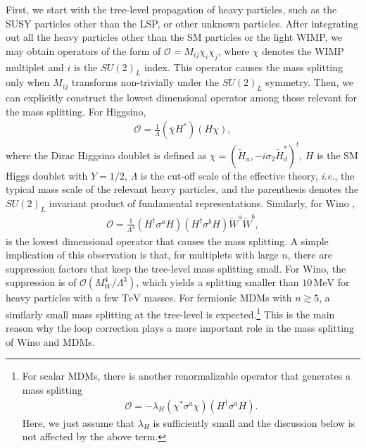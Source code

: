 \documentclass[12pt,twoside,book]{article}
\begin{document}
First, we start with the tree-level propagation of heavy particles, such as the SUSY particles other than the LSP, or other unknown particles.
After integrating out all the heavy particles other than the SM particles or the light WIMP, we may obtain operators of the form of $\mathcal{O} = M_{i j} \chi_i \chi_j$, where $\chi$ denotes the WIMP multiplet and $i$ is the $SU(2)_L$ index.
This operator causes the mass splitting only when $M_{i j}$ transforms non-trivially under the $SU(2)_L$ symmetry.
Then, we can explicitly construct the lowest dimensional operator among those relevant for the mass splitting.
For Higgsino,
\begin{align}
  \mathcal{O} = \frac{1}{\Lambda} (\bar{\chi} H^{*}) (H \chi),
  \label{eq:Higgsino_mass_splitting}
\end{align}
where the Dirac Higgsino doublet is defined as $\chi = (\tilde{H}_u, -i \sigma_2 \tilde{H}_d^{*})^t$, $H$ is the SM Higgs doublet with $Y = 1/2$, $\Lambda$ is the cut-off scale of the effective theory, \textit{i.e.}, the typical mass scale of the relevant heavy particles, and the parenthesis denotes the $SU(2)_L$ invariant product of fundamental representations.
Similarly, for Wino \cite{Gherghetta:1999sw},
\begin{align}
  \mathcal{O} = \frac{1}{\Lambda^3} (H^\dagger \sigma^a H) (H^\dagger \sigma^b H) \tilde{W}^a \tilde{W}^b,
  \label{eq:Wino_mass_splitting}
\end{align}
is the lowest dimensional operator that causes the mass splitting.
A simple implication of this observation is that, for multiplets with large $n$, there are suppression factors that keep the tree-level mass splitting small.
For Wino, the suppression is of $\mathcal{O} (M_W^4 / \Lambda^3)$, which yields a splitting smaller than $10\,\mathrm{MeV}$ for heavy particles with a few $\mathrm{TeV}$ masses.
For fermionic MDMs with $n \gtrsim 5$, a similarly small mass splitting at the tree-level is expected.\footnote
{
  For scalar MDMs, there is another renormalizable operator that generates a mass splitting
  \begin{align*}
    \mathcal{O} = - \lambda_H \left( \chi^{*} \sigma^a \chi \right) \left( H^\dagger \sigma^a H \right).
  \end{align*}
  Here, we just assume that $\lambda_H$ is sufficiently small and the discussion below is not affected by the above term.
}
This is the main reason why the loop correction plays a more important role in the mass splitting of Wino and MDMs.
\end{document}
